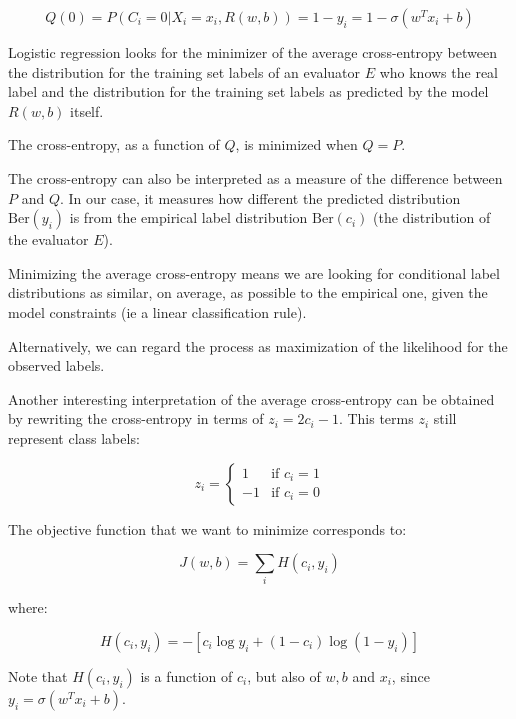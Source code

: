 \begin{equation*}
Q(0) = P(C_i = 0 | X_i = x_i, R(w, b)) = 1 - y_i = 1 - \sigma(w^T x_i + b)
\end{equation*}

Logistic regression looks for the minimizer of the average cross-entropy between the distribution for the training set labels of an evaluator $E$ who knows the real label and the distribution for the training set labels as predicted by the model $R(w, b)$ itself.

The cross-entropy, as a function of $Q$, is minimized when $Q = P$.

The cross-entropy can also be interpreted as a measure of the difference between $P$ and $Q$. In our case, it measures how different the predicted distribution $\text{Ber}(y_i)$ is from the empirical label distribution $\text{Ber}(c_i)$ (the distribution of the evaluator $E$).

Minimizing the average cross-entropy means we are looking for conditional label distributions as similar, on average, as possible to the empirical one, given the model constraints (ie a linear classification rule).

Alternatively, we can regard the process as maximization of the likelihood for the observed labels.

Another interesting interpretation of the average cross-entropy can be obtained by rewriting the cross-entropy in terms of $z_i = 2c_i - 1$. This terms $z_i$ still represent class labels:


\begin{equation*}
z_i = \begin{cases} 1 & \text{if } c_i = 1 \\ -1 & \text{if } c_i = 0 \end{cases}
\end{equation*}

The objective function that we want to minimize corresponds to:


\begin{equation*}
J(w, b) = \sum_i H(c_i, y_i)
\end{equation*}

where:


\begin{equation*}
H(c_i, y_i) = -[c_i \log y_i + (1-c_i) \log (1-y_i)]
\end{equation*}

Note that $H(c_i, y_i)$ is a function of $c_i$, but also of $w, b$ and $x_i$, since $y_i = \sigma(w^T x_i + b)$.


